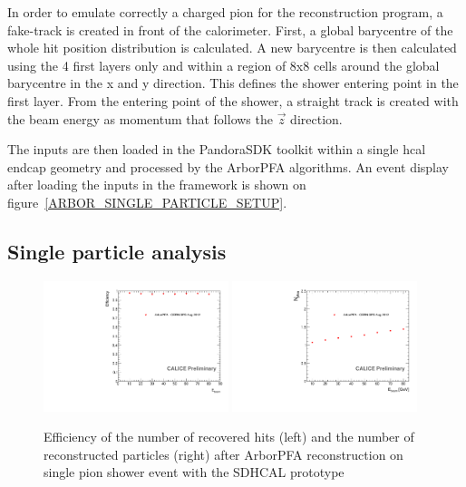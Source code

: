 \documentclass[cits]{JINST}
\begin{document}
In order to emulate correctly a charged pion for the reconstruction program, a fake-track is created in front of the calorimeter. First, a global barycentre of the whole hit position distribution is calculated. A new barycentre is then calculated using the 4 first layers only and within a region of 8x8 cells around the global barycentre in the x and y direction. This defines the shower entering point in the first layer. From the entering point of the shower, a straight track is created with the beam energy as momentum that follows the $\vec{z}$ direction.

The inputs are then loaded in the PandoraSDK toolkit within a single hcal endcap geometry and processed by the ArborPFA algorithms. An event display after loading the inputs in the framework is shown on figure~\ref{ARBOR_SINGLE_PARTICLE_SETUP}.

\subsection{Single particle analysis}

\begin{figure}[!h]
  \begin{center}
    \includegraphics[width=0.48\textwidth]{plots/SingleParticle_Efficiency.pdf}
    \includegraphics[width=0.48\textwidth]{plots/SingleParticle_NPfos.pdf} \\
  \end{center}
  \caption{\label{ARBOR_SINGLE_PARTICLE_EFFICIENCY_AND_NPFOS} Efficiency of the number of recovered hits (left) and the number of reconstructed particles (right) after ArborPFA reconstruction on single pion shower event with the SDHCAL prototype}
\end{figure}
\end{document}

